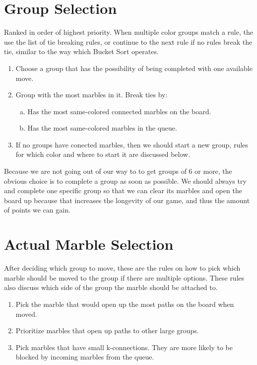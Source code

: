 \documentclass[a4paper,12pt]{article}
\begin{document}
\section*{Group Selection}

Ranked in order of highest priority. When multiple color groups match
a rule, the use the list of tie breaking rules, or continue to the
next rule if no rules break the tie, similar to the way which Bucket
Sort operates.

\begin{enumerate}[1)]

    \item Choose a group that has the possibility of being completed with one available move.

    \item Group with the most marbles in it. Break ties by:
        \begin{enumerate}[a)]
            \item Has the most same-colored connected marbles on the board.
            \item Has the most same-colored marbles in the queue. 
        \end{enumerate}

    \item If no groups have conected marbles, then we should start a new group, rules for which
        color and where to start it are discussed below.

\end{enumerate}

Because we are not going out of our way to to get groups of 6 or more,
the obvious choice is to complete a group as soon as possible. We
should always try and complete one specific group so that we can clear
its marbles and open the board up because that increases the longevity
of our game, and thus the amount of points we can gain.

\section*{Actual Marble Selection}

After deciding which group to move, these are the rules on how to pick which marble should be moved to the group
if there are multiple options. These rules also discuss which side of the group the marble should be attached to.

\begin{enumerate}[1)]
    
    \item Pick the marble that would open up the most paths on the board when moved. 
    \item Prioritize marbles that open up paths to other large groups.
    \item Pick marbles that have small k-connections. They are more
      likely to be blocked by incoming marbles from the queue.

\end{enumerate}
\end{document}
